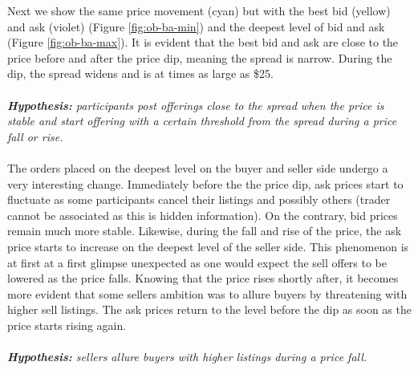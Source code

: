 Next we show the same price movement (cyan) but with the best bid (yellow) and ask (violet) (Figure \ref{fig:ob-ba-min}) and the deepest level of bid and ask (Figure \ref{fig:ob-ba-max}).
It is evident that the best bid and ask are close to the price before and after the price dip, meaning the spread is narrow.
During the dip, the spread widens and is at times as large as \$25.
\\
\\
\textit{\textbf{Hypothesis:} participants post offerings close to the spread when the price is stable and start offering with a certain threshold from the spread during a price fall or rise.}
\\
\\
The orders placed on the deepest level on the buyer and seller side undergo a very interesting change.
Immediately before the the price dip, ask prices start to fluctuate as some participants cancel their listings and possibly others (trader cannot be associated as this is hidden information).
On the contrary, bid prices remain much more stable.
Likewise, during the fall and rise of the price, the ask price starts to increase on the deepest level of the seller side. 
This phenomenon is at first at a first glimpse unexpected as one would expect the sell offers to be lowered as the price falls.
Knowing that the price rises shortly after, it becomes more evident that some sellers ambition was to allure buyers by threatening with higher sell listings.
The ask prices return to the level before the dip as soon as the price starts rising again.
\\
\\
\textit{\textbf{Hypothesis:} sellers allure buyers with higher listings during a price fall.}
%
